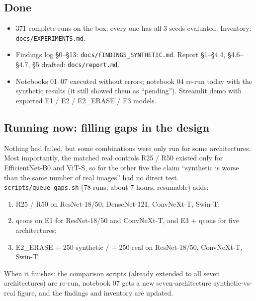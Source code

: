 \documentclass[10pt,a4paper]{article}
\begin{document}
\subsection{Done}
\begin{itemize}
\item 371 complete runs on the box; every one has all 3 seeds evaluated. Inventory: \texttt{docs/EXPERIMENTS.md}.
\item Findings log §0--§13: \texttt{docs/FINDINGS_SYNTHETIC.md}. Report §1--§4.4, §4.6--§4.7, §5 drafted: \texttt{docs/report.md}.
\item Notebooks 01--07 executed without errors; notebook 04 re-run today with the synthetic results (it still showed them as
``pending''). Streamlit demo with exported E1 / E2 / E2_ERASE / E3 models.
\end{itemize}

\subsection{Running now: filling gaps in the design}
Nothing had failed, but some combinations were only run for some architectures. Most importantly, the matched real controls
R25 / R50 existed only for EfficientNet-B0 and ViT-S, so for the other five the claim ``synthetic is worse than the same number of
real images'' had no direct test. \texttt{scripts/queue_gaps.sh} (78 runs, about 7 hours, resumable) adds:
\begin{enumerate}
\item R25 / R50 on ResNet-18/50, DenseNet-121, ConvNeXt-T, Swin-T;
\item qcons on E1 for ResNet-18/50 and ConvNeXt-T, and E3 + qcons for five architectures;
\item E2_ERASE + 250 synthetic / + 250 real on ResNet-18/50, ConvNeXt-T, Swin-T.
\end{enumerate}
When it finishes: the comparison scripts (already extended to all seven architectures) are re-run, notebook 07 gets a new
seven-architecture synthetic-vs-real figure, and the findings and inventory are updated.
\end{document}
